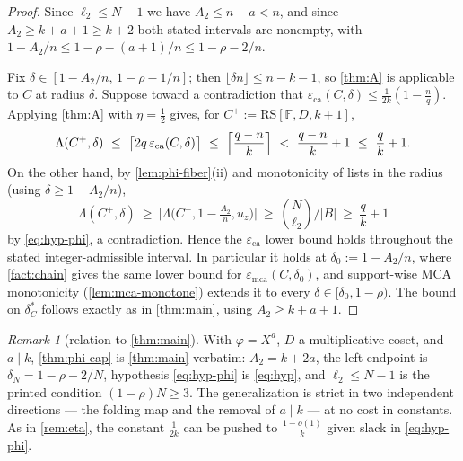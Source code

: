 \documentclass[11pt]{article}
\theoremstyle{definition}
\theoremstyle{remark}
\newtheorem{remark}[remark]{Remark}
\newcommand{\F}{\mathbb{F}}
\newcommand{\B}{B}
\newcommand{\RS}{\mathrm{RS}}
\newcommand{\eca}{\varepsilon_{\mathrm{ca}}}
\newcommand{\emca}{\varepsilon_{\mathrm{mca}}}
\newcommand{\Lst}{\Lambda}
\begin{document}
\begin{proof}
Since $\ell_2\le N-1$ we have $A_2\le n-a<n$, and since $A_2\ge k+a+1\ge k+2$ both stated intervals are nonempty, with $1-A_2/n\le1-\rho-(a+1)/n\le1-\rho-2/n$.

Fix $\delta\in[1-A_2/n,\,1-\rho-1/n]$; then $\lfloor\delta n\rfloor\le n-k-1$, so \cref{thm:A} is applicable to $C$ at radius $\delta$. Suppose toward a contradiction that $\eca(C,\delta)\le\frac1{2k}(1-\frac nq)$. Applying \cref{thm:A} with $\eta=\frac12$ gives, for $C^+:=\RS[\F,D,k+1]$,
\[
\Lst(C^+,\delta)\ \le\ \bigl\lceil2q\,\eca(C,\delta)\bigr\rceil
\ \le\ \Bigl\lceil\frac{q-n}k\Bigr\rceil
\ <\ \frac{q-n}k+1\ \le\ \frac qk+1 .
\]
On the other hand, by \cref{lem:phi-fiber}(ii) and monotonicity of lists in the radius (using $\delta\ge1-A_2/n$),
\[
\Lst(C^+,\delta)\ \ge\ \bigl|\Lst\bigl(C^+,1-\tfrac{A_2}n,u_z\bigr)\bigr|\ \ge\ \binom N{\ell_2}\Big/|\B|\ \ge\ \frac qk+1
\]
by \eqref{eq:hyp-phi}, a contradiction. Hence the $\eca$ lower bound holds throughout the stated integer-admissible interval. In particular it holds at $\delta_0:=1-A_2/n$, where \cref{fact:chain} gives the same lower bound for $\emca(C,\delta_0)$, and support-wise MCA monotonicity (\cref{lem:mca-monotone}) extends it to every $\delta\in[\delta_0,1-\rho)$. The bound on $\delta^*_C$ follows exactly as in \cref{thm:main}, using $A_2\ge k+a+1$.
\end{proof}

\begin{remark}[relation to \cref{thm:main}]\label{rem:phi-cap-scope}
With $\varphi=X^a$, $D$ a multiplicative coset, and $a\mid k$, \cref{thm:phi-cap} is \cref{thm:main} verbatim: $A_2=k+2a$, the left endpoint is $\delta_N=1-\rho-2/N$, hypothesis \eqref{eq:hyp-phi} is \eqref{eq:hyp}, and $\ell_2\le N-1$ is the printed condition $(1-\rho)N\ge3$. The generalization is strict in two independent directions --- the folding map and the removal of $a\mid k$ --- at no cost in constants. As in \cref{rem:eta}, the constant $\frac1{2k}$ can be pushed to $\frac{1-o(1)}k$ given slack in \eqref{eq:hyp-phi}.
\end{remark}
\end{document}
